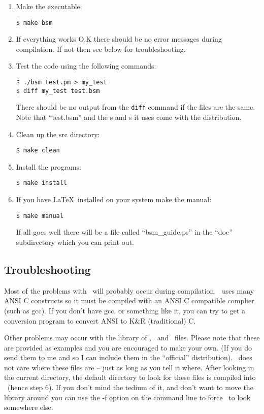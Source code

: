 \documentclass[11pt,twoside]{article}
\begin{document}
\begin{enumerate}
\item Make the executable:
\begin{verbatim}
$ make bsm
\end{verbatim}

\item If everything  works O.K  there  should  be no  error messages during
compilation. If not then see below for troubleshooting.

\item Test the code using the following commands:
\begin{verbatim}
$ ./bsm test.pm > my_test
$ diff my_test test.bsm
\end{verbatim}
There should be no output from the {\tt diff} command if the files are the 
same. Note that ``test.bsm'' and the \lf s and \cmd s it uses come with the 
distribution.

\item Clean up the src directory:
\begin{verbatim}
$ make clean
\end{verbatim}

\item Install the programs:
\begin{verbatim}
$ make install
\end{verbatim}

\item If you have \LaTeX\ installed on your system make the manual:
\begin{verbatim}
$ make manual
\end{verbatim}
If all goes well there will be a file called ``bsm\_guide.ps'' in the ``doc''
subdirectory which you can print out.
\end{enumerate}

\subsection*{Troubleshooting}

Most of the problems with \bsm\ will probably occur during compilation.
\bsm\ uses many ANSI C constructs so it must be compiled with an ANSI C 
compatible complier (such as gcc). If you don't have gcc, or something 
like it, you can try to get a conversion program to convert ANSI to K\&R 
(traditional) C.

Other problems may occur with the library  of \lf, \cmd\ and \fms\ files. 
Please note that these are provided as examples and you are encouraged to make
your own. (If you do send them to me and so I can include them in the 
``official'' distribution). \bsm\ does not care where these files are -- just
as long as you tell it where. After looking in the current directory, the 
default directory to look for these files is compiled into \bsm\ (hence step 
6). If you don't mind the tedium of it, and don't want to move the library 
around you can use the -f option on the command line to force \bsm\ to look 
somewhere else.
\end{document}
